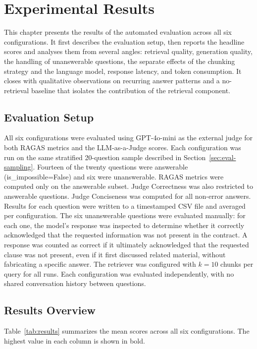 \chapter{Experimental Results}
\label{chap6}

This chapter presents the results of the automated evaluation across all six configurations. It first describes the evaluation setup, then reports the headline scores and analyses them from several angles: retrieval quality, generation quality, the handling of unanswerable questions, the separate effects of the chunking strategy and the language model, response latency, and token consumption. It closes with qualitative observations on recurring answer patterns and a no-retrieval baseline that isolates the contribution of the retrieval component.

\section{Evaluation Setup}

All six configurations were evaluated using GPT-4o-mini as the external judge for both RAGAS metrics and the LLM-as-a-Judge scores. Each configuration was run on the same stratified 20-question sample described in Section~\ref{sec:eval-sampling}. Fourteen of the twenty questions were answerable (is\_impossible=False) and six were unanswerable. RAGAS metrics were computed only on the answerable subset. Judge Correctness was also restricted to answerable questions. Judge Conciseness was computed for all non-error answers. Results for each question were written to a timestamped CSV file and averaged per configuration. The six unanswerable questions were evaluated manually: for each one, the model's response was inspected to determine whether it correctly acknowledged that the requested information was not present in the contract. A response was counted as correct if it ultimately acknowledged that the requested clause was not present, even if it first discussed related material, without fabricating a specific answer. The retriever was configured with $k=10$ chunks per query for all runs. Each configuration was evaluated independently, with no shared conversation history between questions.


\section{Results Overview}


Table~\ref{tab:results} summarizes the mean scores across all six configurations. The highest value in each column is shown in bold.

